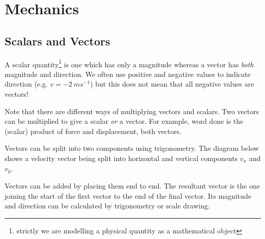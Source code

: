 \documentclass[main.tex]{subfiles}
\begin{document}
\chapter{Mechanics}
\section{Scalars and Vectors}
A scalar quantity\footnote{strictly we are modelling a physical quantity as a mathematical object} is one which has only a magnitude whereas a vector has \emph{both} magnitude and direction. We often use positive and negative values to indicate direction (e.g. $v=-2\ ms^{-1}$) but this does not mean that all negative values are vectors!

Note that there are different ways of multiplying vectors and scalars. Two vectors can be multiplied to give a scalar \emph{or} a vector. For example, word done is the (scalar) product of force and displacement, both vectors.


Vectors can be split into two components using trigonometry. The diagram below shows a velocity vector being split into horizontal and vertical components $v_x$ and $v_y$.

\begin{figure}[h]
\begin{center}
\end{center}
\end{figure}


Vectors can be added by placing them end to end. The resultant vector is the one joining the start of the first vector to the end of the final vector. Its magnitude and direction can be calculated by trigonometry or scale drawing.
\end{document}

